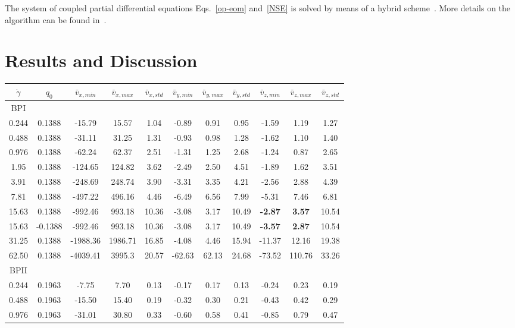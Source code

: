 \documentclass[aps,pre,reprint,superscriptaddress, twocolumn]{revtex4}
\begin{document}
The system of coupled partial differential equations Eqs.~\ref{op-eom}
and~\ref{NSE} is solved by means of a
hybrid scheme~\cite{Marenduzzo:2007}. 
More details on the algorithm can
be found in~\cite{Denniston:2001, Denniston:2004}.


\section{Results and Discussion}

\begin{table}[htpb]
\begin{tabular}{|c|| c || c |c |c||c| c| c||c| c| c|}
\hline
$\dot{\gamma}$ & $q_0$ & $\bar{v}_{x,min}$ & $\bar{v}_{x,max}$ & $\bar{v}_{x,std}$ & $\bar{v}_{y,min}$ & $\bar{v}_{y,max}$ & $\bar{v}_{y,std}$ & $\bar{v}_{z,min}$ & $\bar{v}_{z,max}$ & $\bar{v}_{z,std}$ \\
\hline
BPI \\
\hline
0.244 & 0.1388 &-15.79 &15.57 &1.04 &-0.89 &0.91 &0.95 &-1.59 &1.19 &1.27 \\
0.488 &0.1388 &-31.11 &31.25 &1.31 &-0.93 &0.98 &1.28 &-1.62 &1.10 &1.40 \\
0.976 &0.1388 &-62.24 &62.37 &2.51 &-1.31 &1.25 &2.68 &-1.24 &0.87 &2.65 \\
1.95 & 0.1388 &-124.65 &124.82 &3.62&  -2.49 &2.50 &4.51 &-1.89 & 1.62 &3.51 \\
3.91 &0.1388 &-248.69 &248.74 &3.90&  -3.31 &3.35 &4.21 &-2.56 & 2.88 &4.39 \\
7.81 &0.1388 &-497.22 &496.16 &4.46 &-6.49 &6.56 &7.99 &-5.31 & 7.46 &6.81 \\ 
15.63 &0.1388 &-992.46 &993.18 &10.36 &-3.08 &3.17 &10.49 &\bf{-2.87} & \bf{3.57} &10.54 \\
15.63 &-0.1388 &-992.46 &993.18 &10.36 &-3.08 &3.17 &10.49 &\bf{-3.57} & \bf{2.87} &10.54 \\
31.25 &0.1388 & -1988.36 &1986.71 &16.85 &-4.08 &4.46 &15.94 &-11.37 & 12.16 &19.38\\
62.50 &0.1388 & -4039.41 &3995.3  & 20.57 & -62.63 & 62.13 & 24.68 &-73.52 & 110.76 & 33.26 \\
\hline
BPII \\
\hline
0.244 &0.1963 &-7.75 &7.70 &0.13 &-0.17 &0.17 &0.13 &-0.24 &0.23 &0.19 \\
0.488 &0.1963 &-15.50 &15.40 &0.19 &-0.32 &0.30 &0.21 &-0.43 &0.42 &0.29 \\
0.976 &0.1963 &-31.01 &30.80 &0.33 &-0.60 &0.58 &0.41 &-0.85 &0.79 &0.47 \\

\end{tabular}
\end{table}
\end{document}
